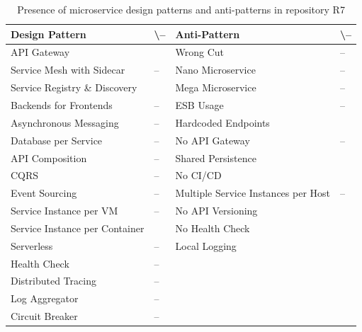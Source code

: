 \documentclass{Configuration_Files/PoliMi3i_thesis}
\newcommand{\cmark}{\ding{51}}%
\begin{document}
\begin{table}[H]
\centering 
    \begin{tabular}{ 
  | >{\centering\arraybackslash} m{16em} 
  | >{\centering\arraybackslash} m{2.2em} 
  | >{\centering\arraybackslash} m{16em} 
  | >{\centering\arraybackslash} m{2.2em} | }
    \hline
    \rowcolor{bluepoli!40}
    \textbf{Design Pattern} & \cmark \textbackslash – & \textbf{Anti-Pattern} & \cmark \textbackslash – \T\B \\
    \hline \hline
    API Gateway & \cmark & Wrong Cut & – \T\B\\
    \hline
    \rowcolor{bluepoli!10}
    Service Mesh with Sidecar & – & Nano Microservice & – \T\B \\
    \hline
    Service Registry \& Discovery & \cmark & Mega Microservice & – \T\B \\
    \hline
    \rowcolor{bluepoli!10}
    Backends for Frontends & – & ESB Usage & – \T\B \\
    \hline
    Asynchronous Messaging & – & Hardcoded Endpoints & \cmark \T\B \\
    \hline
    \rowcolor{bluepoli!10}
    Database per Service & – & No API Gateway & – \T\B \\
    \hline
    API Composition & – & Shared Persistence & \cmark \T\B \\
    \hline
    \rowcolor{bluepoli!10}
    CQRS & – & No CI/CD & \cmark \T\B \\
    \hline
    Event Sourcing & – & Multiple Service Instances per Host & – \T\B \\
    \hline
    \rowcolor{bluepoli!10}
    Service Instance per VM & – & No API Versioning & \cmark \T\B \\
    \hline
    Service Instance per Container & \cmark & No Health Check & \cmark \T\B \\
    \hline
    \rowcolor{bluepoli!10}
    Serverless & – & Local Logging & \cmark \T\B \\
    \hline
    Health Check & – &  & \T\B \\
    \hline
    \rowcolor{bluepoli!10}
    Distributed Tracing & – & & \T\B \\
    \hline
    Log Aggregator & – &  & \T\B \\
    \hline
    \rowcolor{bluepoli!10}
    Circuit Breaker & – &  & \T\B \\
    \hline
    \end{tabular}
    \\[10pt]
    \caption{Presence of microservice design patterns and anti-patterns in repository R7}
    \label{table:R7_result}
\end{table}
\end{document}
